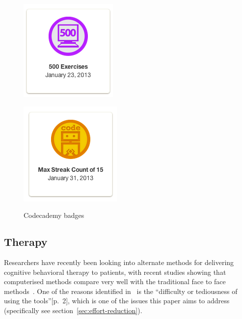 \documentclass[a4paper,12pt]{article}
\begin{document}
\begin{figure}[!ht]
	\centering
	\begin{minipage}{.5\textwidth}
	  \centering
	  \includegraphics[width=.6\linewidth]{./images/codecademy-badge-500exercises}
	  \label{codecademy-badge-500exercises}
	\end{minipage}%
	\begin{minipage}{.5\textwidth}
	  \centering
	  \includegraphics[width=.6\linewidth]{./images/codecademy-badge-maxstreak}
	  \label{codecademy-badge-maxstreak}
	\end{minipage}
	\caption{Codecademy badges}
	\label{codecademy-badges}
\end{figure}

\subsection{Therapy}
Researchers have recently been looking into alternate methods for delivering cognitive behavioral therapy to patients, with recent studies showing that computerised methods compare very well with the traditional face to face methods~\citep{games-for-behavior-change}. One of the reasons identified in~\citep{games-for-behavior-change} is the ``difficulty or tediousness of using the tools''[p.~2], which is one of the issues this paper aims to address (specifically see section~\ref{sec:effort-reduction}).
\end{document}

